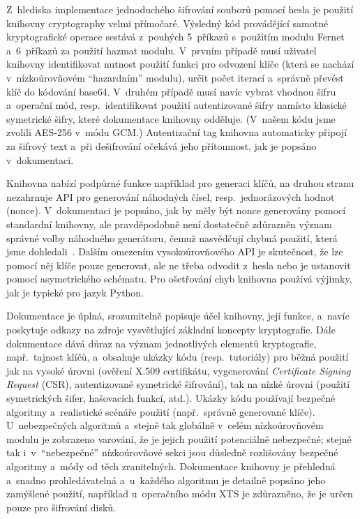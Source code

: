 Z~hlediska implementace jednoduchého šifrování souborů pomocí hesla je použití knihovny cryptography velmi přímočaré. Výsledný kód provádějící samotné kryptografické operace sestává z~pouhých 5~příkazů s~použitím modulu Fernet a~6~příkazů za použití hazmat modulu. V~prvním případě musí uživatel knihovny identifikovat nutnost použití funkci pro odvození klíče (která se nachází v~nízkoúrovňovém ``hazardním'' modulu), určit počet iterací a~správně převést klíč do kódování base64. V~druhém případě musí navíc vybrat vhodnou šifru a~operační mód, resp.\ identifikovat použití autentizované šifry namísto klasické symetrické šifry, které dokumentace knihovny odděluje. (V~našem kódu jsme zvolili AES-256 v~módu GCM.) Autentizační tag knihovna automaticky připojí za šifrový text a~při dešifrování očekává jeho přítomnost, jak je popsáno v~dokumentaci.

Knihovna nabízí podpůrné funkce například pro generaci klíčů, na druhou stranu nezahrnuje API pro generování náhodných čísel, resp.\ jednorázových hodnot (nonce). V~dokumentaci je popsáno, jak by měly být nonce generovány pomocí standardní knihovny, ale pravděpodobně není dostatečně zdůrazněn význam správné volby náhodného generátoru, čemuž nasvědčují chybná použití, která jsme dohledali~\cite{pyca-misuse-random}. Dalším omezením vysokoúrovňového API je skutečnost, že lze pomocí něj klíče pouze generovat, ale ne třeba odvodit z~hesla nebo je ustanovit pomocí asymetrického schématu. Pro ošetřování chyb knihovna používá výjimky, jak je typické pro jazyk Python.

Dokumentace je úplná, srozumitelně popisuje účel knihovny, její funkce, a~navíc poskytuje odkazy na zdroje vysvětlující základní koncepty kryptografie. Dále dokumentace dává důraz na význam jednotlivých elementů kryptografie, např.\ tajnost klíčů, a~obsahuje ukázky kódu (resp.\ tutoriály) pro běžná použití jak na vysoké úrovni (ověření X.509 certifikátu, vygenerování \textit{Certificate Signing Request} (CSR), autentizované symetrické šifrování), tak na nízké úrovni (použití symetrických šifer, hašovacích funkcí, atd.). Ukázky kódu používají bezpečné algoritmy a~realistické scénáře použití (např.\ správně generované klíče). U~nebezpečných algoritmů a~stejně tak globálně v~celém nízkoúrovňovém modulu je zobrazeno varování, že je jejich použití potenciálně nebezpečné; stejně tak i~v~``nebezpečné'' nízkoúrovňové sekci jsou důsledně rozlišovány bezpečné algoritmy a~módy od těch zranitelných. Dokumentace knihovny je přehledná a~snadno prohledávatelná a~u~každého algoritmu je detailně popsáno jeho zamýšlené použití, například u~operačního módu XTS je zdůrazněno, že je určen pouze pro šifrování disků.

